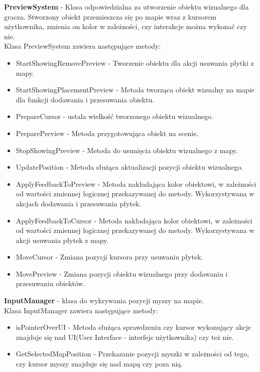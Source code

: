 \documentclass[a4paper,twoside,12pt]{book}
\begin{document}
	\textbf{PreviewSystem} - Klasa odpowiedzialna za utworzenie obiektu wizualnego dla gracza. Stworzony obiekt przemieszcza się po mapie wraz z kursorem użytkownika, zmienia on kolor w zależności, czy interakcje można wykonać czy nie. \\Klasa PreviewSystem zawiera następujące metody:
		\begin{itemize}
			\item StartShowingRemovePreview - Tworzenie obiektu dla akcji usuwania płytki z mapy.
			\item StartShowingPlacementPreview - Metoda tworząca obiekt wizualny na mapie dla funkcji dodawania i przesuwania obiektu.
			\item PrepareCursor - ustala wielkość tworzonego obiektu wizualnego.
			\item PreparePreview - Metoda przygotowująca obiekt na scenie.
			\item StopShowingPreview - Metoda do usunięcia obiektu wizualnego z mapy.
			\item UpdatePosition - Metoda służąca aktualizacji pozycji obiektu wizualnego.
			\item ApplyFeedbackToPreview - Metoda nakładająca kolor obiektowi, w zależności od wartości zmiennej logicznej przekazywanej do metody. Wykorzystywana w akcjach dodawania i przesuwania płytek.
			\item ApplyFeedbackToCursor - Metoda nakładająca kolor obiektowi, w zależności od wartości zmiennej logicznej przekazywanej do metody. Wykorzystywana w akcji usuwania płytek z mapy.
			\item MoveCursor - Zmiana pozycji kursora przy usuwaniu płytek.
			\item MovePreview - Zmiana pozycji obiektu wizualnego przy dodawaniu i przesuwaniu obiektów.
		\end{itemize}
		
	
	\textbf{InputManager} - klasa do wykrywania pozycji myszy na mapie. \\Klasa InputManager zawiera następujące metody:
			\begin{itemize}
				\item isPointerOverUI - Metoda służąca sprawdzeniu czy kursor wykonujący akcje znajduje się nad UI(User Interface - interfejs użytkownika) czy też nie.
				\item GetSelectedMapPosition - Przekazanie pozycji myszki w zależności od tego, czy kursor myszy znajduje się nad mapą czy poza nią.
			\end{itemize} 
		
\end{document}
